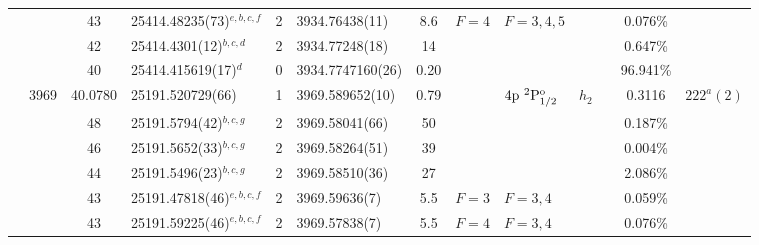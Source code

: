 \begin{table*}
\begin{center}
{\begin{tabular}{:l;l;c;l;c;l;c;l;l;c;c;c;c}
\rowstyle{\itshape}               &        & 43        & 25414.48235(73)$^{e,b,c,f}$      & 2 &    3934.76438(11)  &  8.6 & $F=4                                     $ & $F=3,4,5                                 $ & $      $ &              & 0.076\%   & $     ^{}     $\\
\rowstyle{\itshape}               &        & 42        & 25414.4301(12)$^{b,c,d}$         & 2 &    3934.77248(18)  &   14 & $                                        $ & $                                        $ & $      $ &              & 0.647\%   & $     ^{}     $\\
\rowstyle{\itshape}               &        & 40        & 25414.415619(17)$^{d}$           & 0 &  3934.7747160(26)  & 0.20 & $                                        $ & $                                        $ & $      $ &              & 96.941\%  & $     ^{}     $\\
                                  & 3969   & 40.0780   & 25191.520729(66)$^{}$            & 1 &   3969.589652(10)  & 0.79 & $                                        $ & $4\rm{p}~^2\rm{P}_{1/2}^{\rm o}          $ & $h_{2} $ &              & 0.3116    & $  222^{a}(2)  $\\
\rowstyle{\itshape}               &        & 48        & 25191.5794(42)$^{b,c,g}$         & 2 &    3969.58041(66)  &   50 & $                                        $ & $                                        $ & $      $ &              & 0.187\%   & $     ^{}     $\\
\rowstyle{\itshape}               &        & 46        & 25191.5652(33)$^{b,c,g}$         & 2 &    3969.58264(51)  &   39 & $                                        $ & $                                        $ & $      $ &              & 0.004\%   & $     ^{}     $\\
\rowstyle{\itshape}               &        & 44        & 25191.5496(23)$^{b,c,g}$         & 2 &    3969.58510(36)  &   27 & $                                        $ & $                                        $ & $      $ &              & 2.086\%   & $     ^{}     $\\
\rowstyle{\itshape}               &        & 43        & 25191.47818(46)$^{e,b,c,f}$      & 2 &    3969.59636(7)   &  5.5 & $F=3                                     $ & $F=3,4                                   $ & $      $ &              & 0.059\%   & $     ^{}     $\\
\rowstyle{\itshape}               &        & 43        & 25191.59225(46)$^{e,b,c,f}$      & 2 &    3969.57838(7)   &  5.5 & $F=4                                     $ & $F=3,4                                   $ & $      $ &              & 0.076\%   & $     ^{}     $\\

\end{tabular}}
\end{center}
\end{table*}
